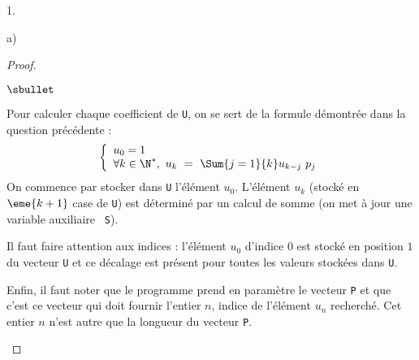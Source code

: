 \begin{noliste}{1.}
\begin{noliste}{a)}
\begin{proof}
\begin{noliste}{$\sbullet$}
    \item Pour calculer chaque coefficient de {\tt U}, on se sert de
      la formule démontrée dans la question précédente :
      \[
      \left\{
        \begin{array}{l}
          u_0 = 1 \\%
          \forall k \in \N^*, \ u_k \ = \ \Sum{j = 1}{k} u_{k-j} \ p_j
        \end{array}
        \right.
      \]
      On commence par stocker dans {\tt U} l'élément $u_0$. L'élément
      $u_k$ (stocké en $\eme{k+1}$ case de {\tt U}) est déterminé par
      un calcul de somme (on met à jour une variable auxiliaire {\tt
        S}).


      \newpage


    \item Il faut faire attention aux indices : l'élément $u_0$ d'indice $0$
      est stocké en position $1$ du vecteur {\tt U} et ce décalage est
      présent pour toutes les valeurs stockées dans {\tt U}.

    \item Enfin, il faut noter que le programme prend en paramètre le
      vecteur {\tt P} et que c'est ce vecteur qui doit fournir
      l'entier $n$, indice de l'élément $u_n$ recherché. Cet entier
      $n$ n'est autre que la longueur du vecteur {\tt P}.
      

\end{noliste}
\end{proof}
\end{noliste}
\end{noliste}
